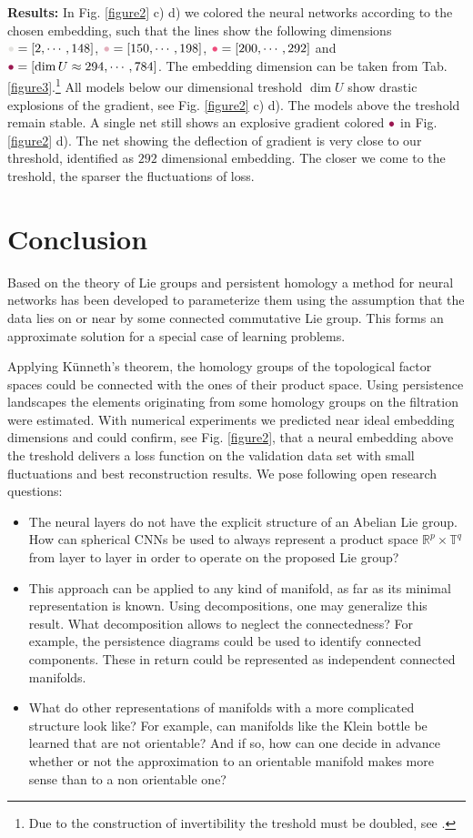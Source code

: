 \documentclass[runningheads,orivec]{llncs}
\begin{document}
\textbf{Results:} In Fig. \ref{figure2} c) d) we colored the neural networks according to the chosen embedding, such that the lines show the following dimensions ${\color{red1}\bullet} = [2, \cdots, 148]$, ${\color{red2}\bullet} = [150, \cdots, 198]$, ${\color{red3}\bullet} = [200, \cdots, 292]$ and ${\color{red4}\bullet} = [\dim U \approx 294, \cdots, 784]$.  The embedding dimension can be taken from Tab. \ref{figure3}.\footnote{Due to the construction of invertibility the treshold must be doubled, see \cite{DinhSB17}.} All models below our dimensional treshold $\dim U$ show drastic explosions of the gradient, see Fig. \ref{figure2} c) d). The models above the treshold remain stable. A single net still shows an explosive gradient colored ${\color{red4}\bullet}$ in Fig. \ref{figure2} d). The net showing the deflection of gradient is very close to our threshold, identified as $292$ dimensional embedding. The closer we come to the treshold, the sparser the fluctuations of loss.


\section{Conclusion}
Based on the theory of Lie groups and persistent homology a method for neural networks has been developed to parameterize them using the assumption that the data lies on or near by some connected commutative Lie group. This forms an approximate solution for a special case of learning problems. 

Applying Künneth's theorem, the homology groups of the topological factor spaces could be connected with the ones of their product space. Using persistence landscapes the elements originating from some homology groups on the filtration were estimated. With numerical experiments we predicted near ideal embedding dimensions and could confirm, see Fig. \ref{figure2}, that a neural embedding above the treshold delivers a loss function on the validation data set with small fluctuations and best reconstruction results. We pose following open research questions:
\begin{itemize}
    \item The neural layers do not have the explicit structure of an Abelian Lie group. How can spherical CNNs \cite{CohenGKW18} be used to always represent a product space $\mathbb{R}^p \times \mathbb{T}^q$ from layer to layer in order to operate on the proposed Lie group?
    \item This approach can be applied to any kind of manifold, as far as its minimal representation is known. Using decompositions, one may generalize this result. What decomposition allows to neglect the connectedness? For example, the persistence diagrams could be used to identify connected components. These in return could be represented as independent connected manifolds.
    \item What do other representations of manifolds with a more complicated structure look like? For example, can manifolds like the Klein bottle be learned that are not orientable? And if so, how can one decide in advance whether or not the approximation to an orientable manifold makes more sense than to a non orientable one?
\end{itemize}



\end{document}

